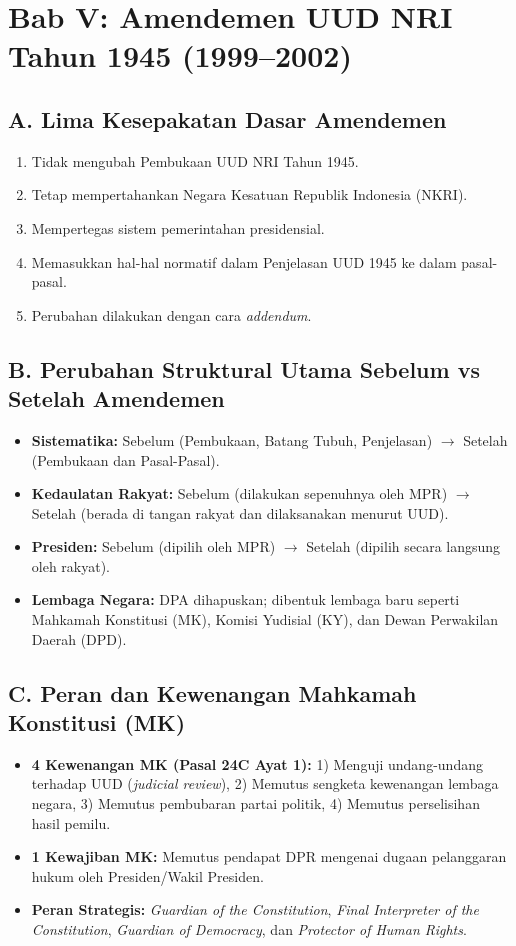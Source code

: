 \section{Bab V: Amendemen UUD NRI Tahun 1945 (1999--2002)}
\subsection{A. Lima Kesepakatan Dasar Amendemen}
\begin{enumerate}
    \item Tidak mengubah Pembukaan UUD NRI Tahun 1945.
    \item Tetap mempertahankan Negara Kesatuan Republik Indonesia (NKRI).
    \item Mempertegas sistem pemerintahan presidensial.
    \item Memasukkan hal-hal normatif dalam Penjelasan UUD 1945 ke dalam pasal-pasal.
    \item Perubahan dilakukan dengan cara \textit{addendum}.
\end{enumerate}

\subsection{B. Perubahan Struktural Utama Sebelum vs Setelah Amendemen}
\begin{itemize}
    \item \textbf{Sistematika:} Sebelum (Pembukaan, Batang Tubuh, Penjelasan) $\rightarrow$ Setelah (Pembukaan dan Pasal-Pasal).
    \item \textbf{Kedaulatan Rakyat:} Sebelum (dilakukan sepenuhnya oleh MPR) $\rightarrow$ Setelah (berada di tangan rakyat dan dilaksanakan menurut UUD).
    \item \textbf{Presiden:} Sebelum (dipilih oleh MPR) $\rightarrow$ Setelah (dipilih secara langsung oleh rakyat).
    \item \textbf{Lembaga Negara:} DPA dihapuskan; dibentuk lembaga baru seperti Mahkamah Konstitusi (MK), Komisi Yudisial (KY), dan Dewan Perwakilan Daerah (DPD).
\end{itemize}

\subsection{C. Peran dan Kewenangan Mahkamah Konstitusi (MK)}
\begin{itemize}
    \item \textbf{4 Kewenangan MK (Pasal 24C Ayat 1):} 
    1) Menguji undang-undang terhadap UUD (\textit{judicial review}), 
    2) Memutus sengketa kewenangan lembaga negara, 
    3) Memutus pembubaran partai politik, 
    4) Memutus perselisihan hasil pemilu.
    \item \textbf{1 Kewajiban MK:} Memutus pendapat DPR mengenai dugaan pelanggaran hukum oleh Presiden/Wakil Presiden.
    \item \textbf{Peran Strategis:} \textit{Guardian of the Constitution}, \textit{Final Interpreter of the Constitution}, \textit{Guardian of Democracy}, dan \textit{Protector of Human Rights}.
\end{itemize}